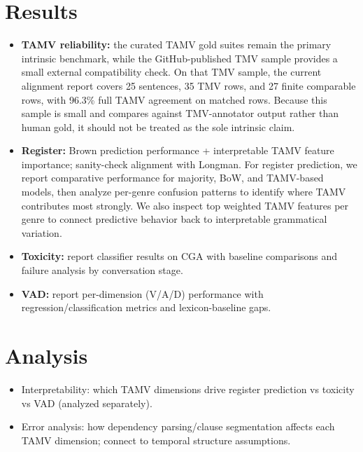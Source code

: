 \documentclass[11pt]{article}
\begin{document}
\section{Results}
\begin{itemize}
  \item \textbf{TAMV reliability:} the curated TAMV gold suites remain the primary intrinsic benchmark, while the GitHub-published TMV sample provides a small external compatibility check. On that TMV sample, the current alignment report covers 25 sentences, 35 TMV rows, and 27 finite comparable rows, with 96.3\% full TAMV agreement on matched rows. Because this sample is small and compares against TMV-annotator output rather than human gold, it should not be treated as the sole intrinsic claim. \citep{Biber20101999LongmanEnglish,Ramm2017AnnotatingGerman}
  \item \textbf{Register:} Brown prediction performance + interpretable TAMV feature importance; sanity-check alignment with Longman. \citep{19684/682R15.00.,Biber20101999LongmanEnglish} For register prediction, we report comparative performance for majority, BoW, and TAMV-based models, then analyze per-genre confusion patterns to identify where TAMV contributes most strongly. We also inspect top weighted TAMV features per genre to connect predictive behavior back to interpretable grammatical variation.
  \item \textbf{Toxicity:} report classifier results on CGA with baseline comparisons and failure analysis by conversation stage. \citep{Zhang2018ConversationsFailure}
  \item \textbf{VAD:} report per-dimension (V/A/D) performance with regression/classification metrics and lexicon-baseline gaps. \citep{Buechel2017EmoBank:Analysis,Mohammad2018ObtainingWords}
\end{itemize}

\section{Analysis}
\begin{itemize}
  \item Interpretability: which TAMV dimensions drive register prediction vs toxicity vs VAD (analyzed separately).
  \item Error analysis: how dependency parsing/clause segmentation affects each TAMV dimension; connect to temporal structure assumptions. \citep{Derczynski2012AnStructure,Nivre2010DependencyParsing}
\end{itemize}
\end{document}
